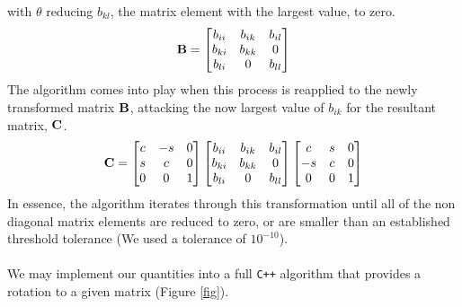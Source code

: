 \documentclass[%
reprint,
superscriptaddress,
showpacs,
nofootinbib,
bibnotes,amsmath,amssymb,aps,
prc, 
]{revtex4-1}
\begin{document}
with $\theta$ reducing $b_{kl}$, the matrix element with the largest value, to zero.
\begin{equation*}
\bold{B} = \begin{bmatrix}
b_{ii} & b_{ik} & b_{il} \\ b_{ki} & b_{kk} & 0  \\ b_{li} & 0 & b_{ll} \\ \end{bmatrix}
\end{equation*}
The algorithm comes into play when this process is reapplied to the newly transformed matrix $\bold{B}$, attacking the now largest value of $b_{ik}$ for the resultant matrix, $\bold{C}$.
\begin{equation*}
\bold{C} = 
\begin{bmatrix} c & -s & 0\\ s & c & 0\\ 0 & 0 & 1 \end{bmatrix} 
\begin{bmatrix}
b_{ii} & b_{ik} & b_{il} \\ b_{ki} & b_{kk} & 0  \\ b_{li} & 0 & b_{ll} \\ \end{bmatrix}
\begin{bmatrix} c & s & 0 \\-s & c & 0\\ 0 & 0 & 1 \end{bmatrix}
\end{equation*}
In essence, the algorithm iterates through this transformation until all of the non diagonal matrix elements are reduced to zero, or are smaller than an established threshold tolerance (We used a tolerance of $10^{-10}$).
\\ \\
We may implement our quantities into a full \verb|C++| algorithm that provides a rotation to a given matrix (Figure \ref{fig}).
\end{document}
